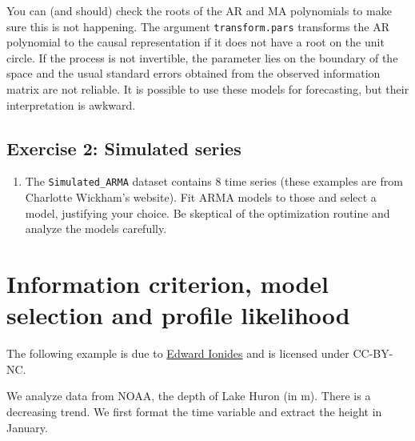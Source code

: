 \documentclass[]{book}
\newenvironment{Shaded}{\begin{snugshade}}{\end{snugshade}}
\newcommand{\KeywordTok}[1]{\textcolor[rgb]{0.13,0.29,0.53}{\textbf{#1}}}
\newcommand{\DataTypeTok}[1]{\textcolor[rgb]{0.13,0.29,0.53}{#1}}
\newcommand{\DecValTok}[1]{\textcolor[rgb]{0.00,0.00,0.81}{#1}}
\newcommand{\StringTok}[1]{\textcolor[rgb]{0.31,0.60,0.02}{#1}}
\newcommand{\CommentTok}[1]{\textcolor[rgb]{0.56,0.35,0.01}{\textit{#1}}}
\newcommand{\OtherTok}[1]{\textcolor[rgb]{0.56,0.35,0.01}{#1}}
\newcommand{\OperatorTok}[1]{\textcolor[rgb]{0.81,0.36,0.00}{\textbf{#1}}}
\newcommand{\NormalTok}[1]{#1}
\providecommand{\tightlist}{%
  \setlength{\itemsep}{0pt}\setlength{\parskip}{0pt}}
\begin{document}
You can (and should) check the roots of the AR and MA polynomials to
make sure this is not happening. The argument \texttt{transform.pars}
transforms the AR polynomial to the causal representation if it does not
have a root on the unit circle. If the process is not invertible, the
parameter lies on the boundary of the space and the usual standard
errors obtained from the observed information matrix are not reliable.
It is possible to use these models for forecasting, but their
interpretation is awkward.

\subsection{Exercise 2: Simulated
series}\label{exercise-2-simulated-series}

\begin{enumerate}
\def\labelenumi{\arabic{enumi}.}
\tightlist
\item
  The \texttt{Simulated\_ARMA} dataset contains 8 time series (these
  examples are from Charlotte Wickham's website). Fit ARMA models to
  those and select a model, justifying your choice. Be skeptical of the
  optimization routine and analyze the models carefully.
\end{enumerate}

\section{Information criterion, model selection and profile
likelihood}\label{information-criterion-model-selection-and-profile-likelihood}

The following example is due to
\href{http://ionides.github.io/531w16/notes05/notes5.html}{Edward
Ionides} and is licensed under CC-BY-NC.

We analyze data from NOAA, the depth of Lake Huron (in m). There is a
decreasing trend. We first format the time variable and extract the
height in January.

\begin{Shaded}
\end{Shaded}
\end{document}
